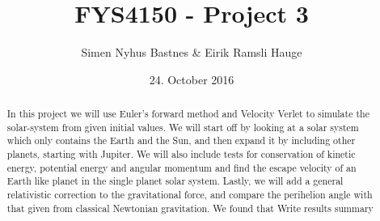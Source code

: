 \documentclass{article}
\title{FYS4150 - Project 3}
\author{Simen Nyhus Bastnes \& Eirik Ramsli Hauge}
\date{24. October 2016}
\newcommand{\husk}[1]{\color{red} #1 \color{black}}
\begin{document}
\maketitle
\begin{abstract}
In this project we will use Euler's forward method and Velocity Verlet to simulate the solar-system from given initial values. We will start off by looking at a solar system which only contains the Earth and the Sun, and then expand it by including other planets, starting with Jupiter. We will also include tests for conservation of kinetic energy, potential energy and angular momentum and find the escape velocity of an Earth like planet in the single planet solar system. Lastly, we will add a general relativistic correction to the gravitational force, and compare the perihelion angle with that given from classical Newtonian gravitation. We found that \husk{Write results summary}
\end{abstract}
\end{document}
